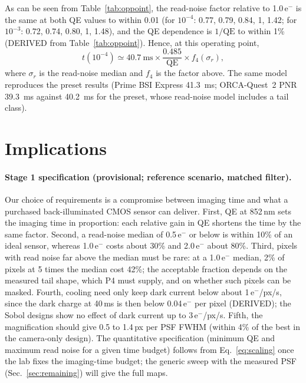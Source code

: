 \documentclass[11pt,a4paper]{article}
\newcommand{\elec}{e$^-$}
\begin{document}
As can be seen from Table~\ref{tab:oppoint}, the read-noise factor relative to 1.0\,\elec{} is the same
at both QE values to within 0.01 (for $10^{-4}$: 0.77, 0.79, 0.84, 1, 1.42; for $10^{-3}$: 0.72, 0.74,
0.80, 1, 1.48), and the QE dependence is $1/\mathrm{QE}$ to within 1\% (DERIVED from
Table~\ref{tab:oppoint}). Hence, at this operating point,
\begin{equation}
  t(10^{-4}) \simeq \SI{40.7}{\milli\second} \times \frac{0.485}{\mathrm{QE}} \times f_4(\sigma_r),
  \label{eq:scaling}
\end{equation}
where $\sigma_r$ is the read-noise median and $f_4$ is the factor above. The same model reproduces the
preset results (Prime BSI Express \SI{41.3}{\milli\second}; ORCA-Quest~2 PNR \SI{39.3}{\milli\second}
against \SI{40.2}{\milli\second} for the preset, whose read-noise model includes a tail class).

\section{Implications}

\paragraph{Stage 1 specification (provisional; reference scenario, matched filter).} Our choice of
requirements is a compromise between imaging time and what a purchased back-illuminated CMOS sensor can
deliver. First, QE at 852\,nm sets the imaging time in proportion: each relative gain in QE shortens the
time by the same factor. Second, a read-noise median of 0.5\,\elec{} or below is within 10\% of an ideal
sensor, whereas 1.0\,\elec{} costs about 30\% and 2.0\,\elec{} about 80\%. Third, pixels with read noise
far above the median must be rare: at a 1.0\,\elec{} median, 2\% of pixels at 5 times the median cost
42\%; the acceptable fraction depends on the measured tail shape, which P4 must supply, and on whether
such pixels can be masked. Fourth, cooling need only keep dark current below about 1\,\elec/px/s, since
the dark charge at 40\,ms is then below 0.04\,\elec{} per pixel (DERIVED); the Sobol designs show no
effect of dark current up to 3\,\elec/px/s. Fifth, the magnification should give 0.5 to 1.4\,px per PSF
FWHM (within 4\% of the best in the camera-only design). The quantitative specification (minimum QE and
maximum read noise for a given time budget) follows from Eq.~\eqref{eq:scaling} once the lab fixes the
imaging-time budget; the generic sweep with the measured PSF (Sec.~\ref{sec:remaining}) will give the
full maps.
\end{document}
